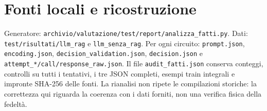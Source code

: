 \documentclass[a4paper,10pt]{article}
\begin{document}
\section*{Fonti locali e ricostruzione}
Generatore: \texttt{archivio/valutazione/test/report/analizza\_fatti.py}. Dati: \texttt{test/risultati/llm\_rag} e \texttt{llm\_senza\_rag}. Per ogni circuito: \texttt{prompt.json}, \texttt{encoding.json}, \texttt{decision\_validation.json}, \texttt{decision.json} e \texttt{attempt\_*/call/response\_raw.json}.
Il file \texttt{audit\_fatti.json} conserva conteggi, controlli su tutti i tentativi, i tre JSON completi, esempi train integrali e impronte SHA-256 delle fonti. La rianalisi non ripete le compilazioni storiche: la correttezza qui riguarda la coerenza con i dati forniti, non una verifica fisica della fedeltà.
\end{document}
